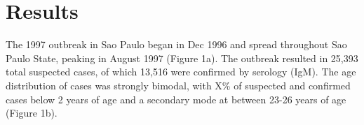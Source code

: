 \section{\texorpdfstring{\textbf{Results}}{Results}}\label{results}

The 1997 outbreak in Sao Paulo began in Dec 1996 and spread throughout
Sao Paulo State, peaking in August 1997 (Figure 1a). The outbreak
resulted in 25,393 total suspected cases, of which 13,516 were confirmed
by serology (IgM). The age distribution of cases was strongly bimodal,
with X\% of suspected and confirmed cases below 2 years of age and a
secondary mode at between 23-26 years of age (Figure 1b).